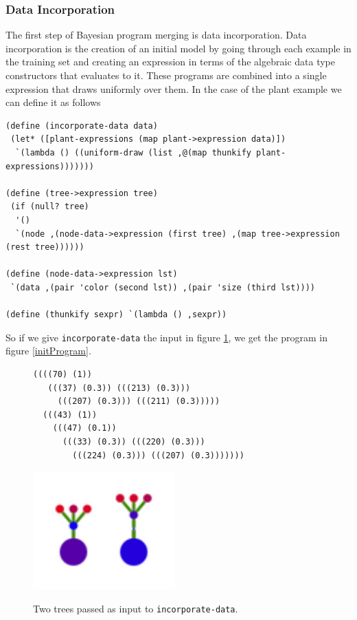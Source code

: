 \documentclass[a4paper,10pt]{article}
\begin{document}
\subsubsection{Data Incorporation}
The first step of Bayesian program merging is data incorporation.  Data incorporation is the creation of an initial model by going through each example in the training set and creating an expression in terms of the algebraic data type constructors that evaluates to it.  These programs are combined into a single expression that draws uniformly over them.  In the case of the plant example we can define it as follows
\begin{verbatim}
(define (incorporate-data data)
 (let* ([plant-expressions (map plant->expression data)])
  `(lambda () ((uniform-draw (list ,@(map thunkify plant-expressions)))))))

(define (tree->expression tree)
 (if (null? tree)
  '()
  `(node ,(node-data->expression (first tree) ,(map tree->expression (rest tree))))))

(define (node-data->expression lst)
 `(data ,(pair 'color (second lst)) ,(pair 'size (third lst))))

(define (thunkify sexpr) `(lambda () ,sexpr))
\end{verbatim}
So if we give \texttt{incorporate-data} the input in figure \ref{initData}, we get the program in figure \ref{initProgram}.
\begin{figure}[h]
\begin{center}
\begin{verbatim}
((((70) (1))
   (((37) (0.3)) (((213) (0.3)))
     (((207) (0.3))) (((211) (0.3)))))
  (((43) (1))
    (((47) (0.1))
      (((33) (0.3)) (((220) (0.3)))
        (((224) (0.3))) (((207) (0.3)))))))
\end{verbatim}
\includegraphics[scale=.7]{initData.pdf}
\label{initData}
\caption{Two trees passed as input to \texttt{incorporate-data}.}
\end{center}
\end{figure}
\end{document}
